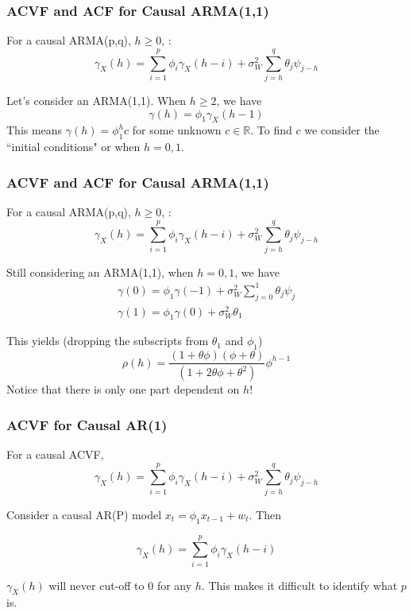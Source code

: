 \documentclass[%
xcolor=pdftex]{beamer}
\begin{document}
\begin{frame}
\frametitle{ACVF and ACF for Causal ARMA(1,1)}

For a causal ARMA(p,q), $h\ge 0$, :
$$
\gamma_X(h) = \sum_{i=1}^p \phi_i \gamma_X(h-i) + \sigma^2_W \sum_{j=h}^q \theta_j\psi_{j-h} 
$$

Let's consider an ARMA(1,1). When $h \ge 2$, we have
$$
\gamma(h) = \phi_1 \gamma_X(h-1)
$$
This means $\gamma(h) = \phi_1^h c$ for some unknown $c \in \mathbb{R}$. To find $c$ we consider the ``initial conditions" or when $h = 0,1$.

\end{frame}


\begin{frame}
\frametitle{ACVF and ACF for Causal ARMA(1,1)}

For a causal ARMA(p,q), $h\ge 0$, :
$$
\gamma_X(h) = \sum_{i=1}^p \phi_i \gamma_X(h-i) + \sigma^2_W \sum_{j=h}^q \theta_j\psi_{j-h} 
$$

Still considering an ARMA(1,1), when $h = 0,1$, we have
\begin{eqnarray}
\gamma(0) = \phi_1 \gamma(-1) + \sigma^2_W\sum_{j=0}^1 \theta_j \psi_{j} \\
\gamma(1) = \phi_1 \gamma(0)  + \sigma^2_W \theta_1 
\end{eqnarray}

This yields (dropping the subscripts from $\theta_1$ and $\phi_1$)
$$
\rho(h) = \frac{(1 + \theta\phi)(\phi + \theta)}{(1 + 2 \theta\phi + \theta^2)}\phi^{h-1}
$$
Notice that there is only one part dependent on $h$!

\end{frame}


\begin{frame}
\frametitle{ACVF for Causal AR(1)}

For a causal ACVF,
$$
\gamma_X(h) = \sum_{i=1}^p \phi_i \gamma_X(h-i) + \sigma^2_W \sum_{j=h}^q \theta_j\psi_{j-h} 
$$

Consider a causal AR(P) model $x_t=\phi_1
x_{t-1}+w_t$.  Then

$$
\gamma_X(h) = \sum_{i=1}^p \phi_i \gamma_X(h-i) 
$$

$\gamma_X(h)$ will never cut-off to $0$ for any $h$. This makes it difficult to identify what $p$ is.


\vspace{40mm}

\end{frame}
\end{document}
